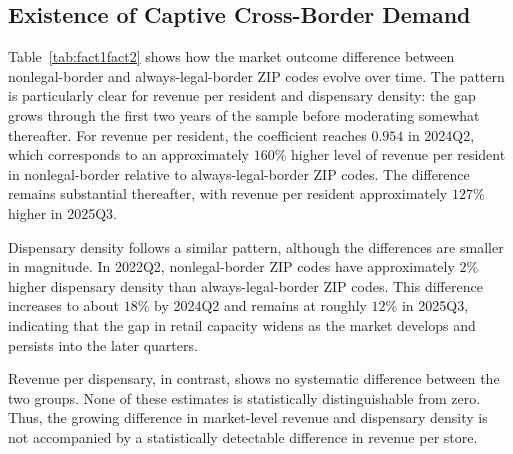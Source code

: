 \documentclass[english,12pt]{article}
\begin{document}
\subsection{Existence of Captive Cross-Border Demand}
\label{sec:result1}

Table~\ref{tab:fact1fact2} shows how the market outcome difference between nonlegal-border and always-legal-border ZIP codes evolve over time. The pattern is particularly clear for revenue per resident and dispensary density: the gap grows through the first two years of the sample before moderating somewhat thereafter. For revenue per resident, the coefficient reaches $0.954$ in 2024Q2, which corresponds to an approximately $160\%$ higher level of revenue per resident in nonlegal-border relative to always-legal-border ZIP codes. The difference remains substantial thereafter, with revenue per resident approximately $127\%$ higher in 2025Q3.

Dispensary density follows a similar pattern, although the differences are smaller in magnitude. In 2022Q2, nonlegal-border ZIP codes have approximately $2\%$ higher dispensary density than always-legal-border ZIP codes. This difference increases to about $18\%$ by 2024Q2 and remains at roughly $12\%$ in 2025Q3, indicating that the gap in retail capacity widens as the market develops and persists into the later quarters.

Revenue per dispensary, in contrast, shows no systematic difference between the two groups. None of these estimates is statistically distinguishable from zero. Thus, the growing difference in market-level revenue and dispensary density is not accompanied by a statistically detectable difference in revenue per store.



\begin{table}[htbp]
\centering\scriptsize

\caption{Quarter-specific nonlegal- vs.\ always-legal-border coefficients $\hat\beta_q$ for revenue per resident, dispensary density, and revenue per store. Sample: full New Mexico ZIP-code panel, 2022Q2--2026Q2 (368 ZIP codes, zero-inclusive; revenue-per-store column restricted to ZIP-quarters with at least one operating dispensary). Each $\hat\beta_q$ is the nonlegal-vs.\ always-legal-border gap in that quarter. Revenue-per-resident and density columns in inverse-hyperbolic-sine units; revenue-per-store column in logs. All quarters include $\log(\text{population})$ and calendar-quarter fixed effects; standard errors (in parentheses) clustered by county. $^{*}p<.10$ $^{**}p<.05$ $^{***}p<.01$.}  %
\label{tab:fact1fact2}
\end{table}
\end{document}
